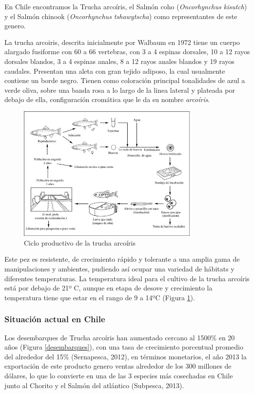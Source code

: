 \documentclass[12pt,a4paper,]{article}
\begin{document}
En Chile encontramos la Trucha arcoíris, el Salmón coho
(\emph{Oncorhynchus kisutch}) y el Salmón chinook (\emph{Oncorhynchus
tshawytscha}) como representantes de este genero.

La trucha arcoiris, descrita inicialmente por Walbaum en 1972 tiene un
cuerpo alargado fusiforme con 60 a 66 vertebras, con 3 a 4 espinas
dorsales, 10 a 12 rayos dorsales blandos, 3 a 4 espinas anales, 8 a 12
rayos anales blandos y 19 rayos caudales. Presentan una aleta con gran
tejido adiposo, la cual usualmente contiene un borde negro. Tienen como
coloración principal tonalidades de azul a verde oliva, sobre una banda
rosa a lo largo de la linea lateral y plateada por debajo de ella,
configuración cromática que le da su nombre \emph{arcoíris}.

\begin{figure}[h!]
    \centering
    \includegraphics[width=9cm]{1} 
    \caption {Ciclo productivo de la trucha arcoíris}
    \label {fig:ciclo}
\end{figure}

Este pez es resistente, de crecimiento rápido y tolerante a una amplia
gama de manipulaciones y ambientes, pudiendo así ocupar una variedad de
hábitats y diferentes temperaturas. La temperatura ideal para el cultivo
de la trucha arcoíris está por debajo de 21º C, aunque en etapa de
desove y crecimiento la temperatura tiene que estar en el rango de 9 a
14ºC (Figura \ref{fig:ciclo}).

\subsubsection{Situación actual en
Chile}\label{situaciuxf3n-actual-en-chile}

Los desembarques de Trucha arcoíris han aumentado cercano al 1500\% en
20 años (Figura \ref{desembarques}), con una tasa de crecimiento
porcentual promedio del alrededor del 15\% (Sernapesca, 2012), en
términos monetarios, el año 2013 la exportación de este producto genero
ventas alrededor de los 300 millones de dólares, lo que lo convierte en
una de las 3 especies más cosechadas en Chile junto al Chorito y el
Salmón del atlántico (Subpesca, 2013).
\end{document}
